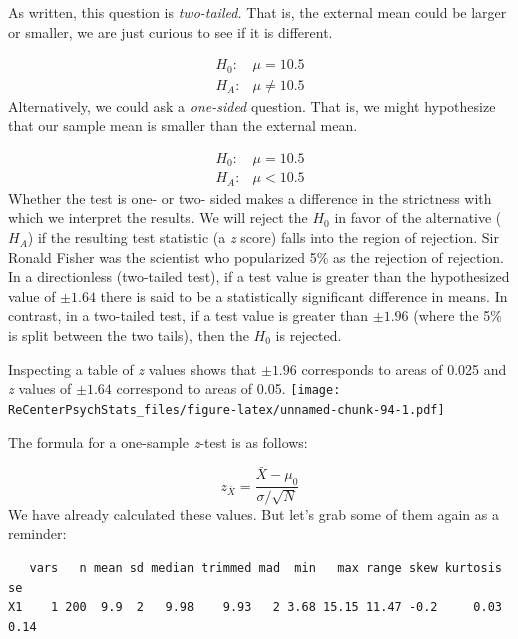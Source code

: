 \documentclass[
  11pt,
]{book}
\newenvironment{Shaded}{\begin{snugshade}}{\end{snugshade}}
\newcommand{\FunctionTok}[1]{\textcolor[rgb]{0.00,0.00,0.00}{#1}}
\newcommand{\NormalTok}[1]{#1}
\newcommand{\SpecialCharTok}[1]{\textcolor[rgb]{0.00,0.00,0.00}{#1}}
\begin{document}
As written, this question is \emph{two-tailed.} That is, the external mean could be larger or smaller, we are just curious to see if it is different.

\[
\begin{array}{ll}
H_0: & \mu = 10.5 \\
H_A: & \mu \neq 10.5
\end{array}
\]
Alternatively, we could ask a \emph{one-sided} question. That is, we might hypothesize that our sample mean is smaller than the external mean.

\[
\begin{array}{ll}
H_0: & \mu = 10.5 \\
H_A: & \mu < 10.5
\end{array}
\]
Whether the test is one- or two- sided makes a difference in the strictness with which we interpret the results. We will reject the \(H_0\) in favor of the alternative (\(H_A\)) if the resulting test statistic (a \emph{z} score) falls into the region of rejection. Sir Ronald Fisher was the scientist who popularized 5\% as the rejection of rejection. In a directionless (two-tailed test), if a test value is greater than the hypothesized value of \(\pm 1.64\) there is said to be a statistically significant difference in means. In contrast, in a two-tailed test, if a test value is greater than \(\pm 1.96\) (where the 5\% is split between the two tails), then the \(H_0\) is rejected.

Inspecting a table of \emph{z} values shows that \(\pm 1.96\) corresponds to areas of 0.025 and \emph{z} values of \(\pm 1.64\) correspond to areas of 0.05.
\texttt{[image: ReCenterPsychStats\_files/figure-latex/unnamed-chunk-94-1.pdf]}

The formula for a one-sample \emph{z}-test is as follows:

\[
z_{\bar{X}} =  \frac{\bar{X} - \mu_0}{\sigma / \sqrt{N}}
\]
We have already calculated these values. But let's grab some of them again as a reminder:

\begin{Shaded}
\end{Shaded}

\begin{verbatim}
   vars   n mean sd median trimmed mad  min   max range skew kurtosis   se
X1    1 200  9.9  2   9.98    9.93   2 3.68 15.15 11.47 -0.2     0.03 0.14
\end{verbatim}
\end{document}
